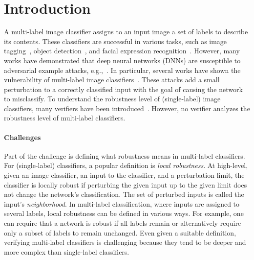 
\section{Introduction}

A multi-label image classifier assigns to an input image a set of labels to describe its contents.
These classifiers are successful in various tasks, such as image tagging~\cite{IMAGETAGGING}, object detection~\cite{ObjectDetection}, and facial expression recognition~\cite{FacialRec}.
However, many works have demonstrated that deep neural networks (DNNs) are susceptible to adversarial example attacks, e.g.,~\cite{ref7,ref15,szegedy2014intriguing,ref17,ref29,ref56}. In particular, several works have shown the vulnerability of multi-label image classifiers~\cite{MultiVul1, MultiVul2, MultiVul3}.
These attacks add a small perturbation to a correctly classified input with the goal of causing the network to misclassify.
To understand the robustness level of (single-label) image classifiers, many verifiers have been introduced~\cite{MIPVERIFY, INCOMPLETE1, INCOMPLETE2, COMPLETE, ABSTRACTINTER}.
However, no verifier analyzes the robustness level of multi-label classifiers. %

\paragraph{Challenges} Part of the challenge is defining what robustness means in multi-label classifiers.
For (single-label) classifiers, a popular definition is \emph{local robustness}.
At high-level, given an image classifier, an input to the classifier, and a perturbation limit, the classifier is locally robust if perturbing the given input up to the given limit does not change the network's classification.
The set of perturbed inputs is called the input's \emph{neighborhood}.
In multi-label classification, where inputs are assigned to several labels, local robustness can be defined in various ways. For example, one can require that a network is robust if all labels remain or alternatively require only a subset of labels to remain unchanged. 
Even given a suitable definition, verifying multi-label classifiers is challenging because they tend to be deeper and more complex than single-label classifiers.

